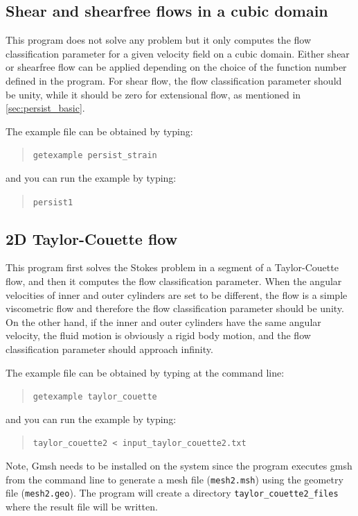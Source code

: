 \subsection{Shear and shearfree flows in a cubic domain}
This program does not solve any problem but it only computes
the flow classification parameter for a given velocity field on a cubic domain.
Either shear or shearfree flow can be applied depending on the
choice of the function number defined in the program.
For shear flow, the flow classification parameter should be unity,
while it should be zero for extensional flow, as mentioned in \ref{sec:persist_basic}.

The example file can be obtained by typing:
\begin{quote}
  \texttt{getexample persist\_strain}
\end{quote}
and you can run the example by typing:
\begin{quote}
  \texttt{persist1}
\end{quote}

\subsection{2D Taylor-Couette flow}
\label{sec:persist_taylorcouette}
This program first solves the Stokes problem in a segment of a Taylor-Couette flow,
and then it computes the flow classification parameter.
When the angular velocities of inner and outer cylinders are set to be different,
the flow is a simple viscometric flow and therefore the flow classification parameter
should be unity.
On the other hand, if the inner and outer cylinders have the same angular velocity, 
the fluid motion is obviously a rigid body motion, 
and the flow classification parameter should approach infinity.

The example file can be obtained by typing at the command line:
\begin{quote}
  \texttt{getexample taylor\_couette}
\end{quote}
and you can run the example by typing:
\begin{quote}
  \texttt{taylor\_couette2 < input\_taylor\_couette2.txt}
\end{quote}
Note, Gmsh needs to be installed on the system
since the program executes gmsh from the command line
to generate a mesh file (\texttt{mesh2.msh})
using the geometry file (\texttt{mesh2.geo}).
The program will create a directory \texttt{taylor\_couette2\_files}
where the result file will be written.

